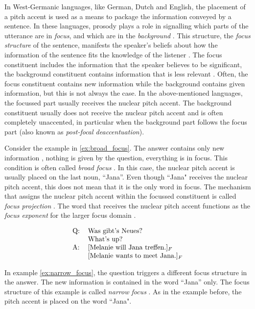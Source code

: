 In West-Germanic languages, like German, Dutch and English, the placement of a pitch accent is used as a means to package the information conveyed by a sentence. In these languages, prosody plays a role in signalling which parts of the utterance are in \emph{focus}, and which are in the \emph{background} \citep{Lambrecht1994}. This structure, the \emph{focus structure} of the sentence, manifests the speaker's beliefs about how the information of the sentence fits the knowledge of the listener \citep{Vallduvi1992}. The focus constituent includes the information that the speaker believes to be significant, the background constituent contains information that is less relevant \citep{Gussenhoven2004}. Often, the focus constituent contains new information while the background contains given information, but this is not always the case. In the above-mentioned languages, the focussed part usually receives the nuclear pitch accent. The background constituent usually does not receive the nuclear pitch accent and is often completely unaccented, in particular when the background part follows the focus part (\largerpage{}also known as \emph{post-focal deaccentuation}).

Consider the example in \ref{ex:broad_focus}. The answer contains only new information \citep{Ladd1980, Gussenhoven2004}, nothing is given by the question, everything is in focus. This condition is often called \emph{broad focus} \citep{Ladd1980}. In this case, the nuclear pitch accent is usually placed on the last noun, ``Jana”. Even though ``Jana" receives the nuclear pitch accent, this does not mean that it is the only word in focus. The mechanism that assigns the nuclear pitch accent within the focussed constituent is called \emph{focus projection} \citep{Büring2003, Ladd2008}. The word that receives the nuclear pitch accent functions as the \emph{focus exponent} for the larger focus domain \citep{Ladd2008}. 

\begin{equation}
\begin{tabular}{ll}
Q: & 	Was gibt’s Neues?\\
&	What’s up?\\
A: &	[Melanie will Jana treffen.]$_F$\\
&	[Melanie wants to meet Jana.]$_F$
\end{tabular}
\label{ex:broad_focus}
\end{equation}

In example \ref{ex:narrow_focus}, the question triggers a different focus structure in the answer. The new information is contained in the word ``Jana” only. The focus structure of this example is called \emph{narrow focus} \citep{Ladd1980, Gussenhoven2004}. As in the example before, the pitch accent is placed on the word ``Jana".

